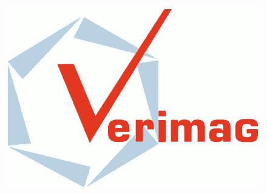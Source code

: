 \begin{frame}[plain]
\maketitle
%
%
\begin{minipage}{1\textwidth}
\vspace{-4em}
\begin{minipage}{0.3\textwidth}
\\
\end{minipage}
%
\hspace{2em}
\begin{minipage}{0.3\textwidth}
\\
\end{minipage}
%
\begin{minipage}{0.25\textwidth}
\\
\end{minipage}
%
\end{minipage}
%
\begin{minipage}{1\textwidth}
\vspace{0.5em}
\center
%
\begin{minipage}{0.2\textwidth}
\includegraphics[scale=0.15]{figures/LogoVERIMAG.png}
\end{minipage}
%
\begin{minipage}{0.5\textwidth}
{}
\end{minipage}
\end{minipage}
\end{frame}

